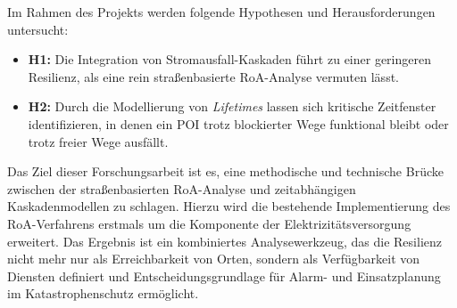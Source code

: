 Im Rahmen des Projekts werden folgende Hypothesen und Herausforderungen untersucht:
\begin{itemize}
    \item \textbf{H1:} Die Integration von Stromausfall-Kaskaden führt zu einer geringeren Resilienz, als eine rein straßenbasierte RoA-Analyse vermuten lässt.
    \item \textbf{H2:} Durch die Modellierung von \textit{Lifetimes} lassen sich kritische Zeitfenster identifizieren, in denen ein POI trotz blockierter Wege funktional bleibt oder trotz freier Wege ausfällt.
\end{itemize}

Das Ziel dieser Forschungsarbeit ist es, eine methodische und technische Brücke zwischen der straßenbasierten RoA-Analyse und zeitabhängigen Kaskadenmodellen zu schlagen.
Hierzu wird die bestehende Implementierung des RoA-Verfahrens erstmals um die Komponente der Elektrizitätsversorgung erweitert.
Das Ergebnis ist ein kombiniertes Analysewerkzeug, das die Resilienz nicht mehr nur als Erreichbarkeit von Orten, sondern als Verfügbarkeit von Diensten definiert und Entscheidungsgrundlage für Alarm- und Einsatzplanung im Katastrophenschutz ermöglicht.

